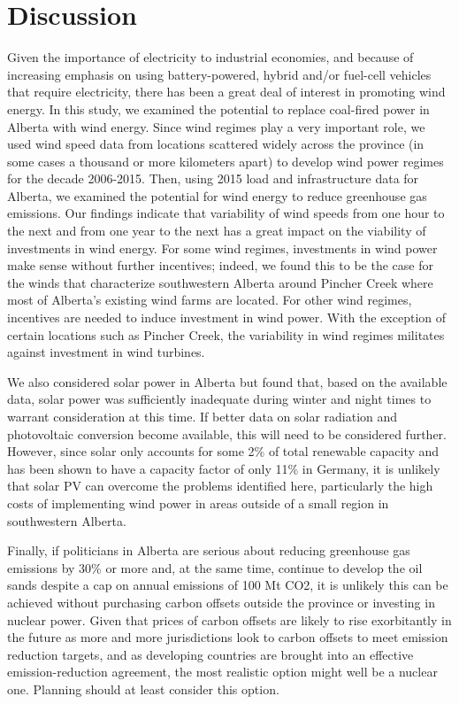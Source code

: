 \section{Discussion}
\label{sec:Discussion}

Given the importance of electricity to industrial economies, and because of increasing emphasis on using battery-powered, hybrid and/or fuel-cell vehicles that require electricity, there has been a great deal of interest in promoting wind energy. In this study, we examined the potential to replace coal-fired power in Alberta with wind energy. Since wind regimes play a very important role, we used wind speed data from locations scattered widely across the province (in some cases a thousand or more kilometers apart) to develop wind power regimes for the decade 2006-2015. Then, using 2015 load and infrastructure data for Alberta, we examined the potential for wind energy to reduce greenhouse gas emissions. Our findings indicate that variability of wind speeds from one hour to the next and from one year to the next has a great impact on the viability of investments in wind energy. For some wind regimes, investments in wind power make sense without further incentives; indeed, we found this to be the case for the winds that characterize southwestern Alberta around Pincher Creek where most of Alberta’s existing wind farms are located. For other wind regimes, incentives are needed to induce investment in wind power. With the exception of certain locations such as Pincher Creek, the variability in wind regimes militates against investment in wind turbines.


We also considered solar power in Alberta but found that, based on the available data, solar power was sufficiently inadequate during winter and night times to warrant consideration at this time. If better data on solar radiation and photovoltaic conversion become available, this will need to be considered further. However, since solar only accounts for some 2\% of total renewable capacity and has been shown to have a capacity factor of only 11\% in Germany, it is unlikely that solar PV can overcome the problems identified here, particularly the high costs of implementing wind power in areas outside of a small region in southwestern Alberta. 



Finally, if politicians in Alberta are serious about reducing greenhouse gas emissions by 30\% or more and, at the same time, continue to develop the oil sands despite a cap on annual emissions of 100 Mt CO2, it is unlikely this can be achieved without purchasing carbon offsets outside the province or investing in nuclear power. Given that prices of carbon offsets are likely to rise exorbitantly in the future as more and more jurisdictions look to carbon offsets to meet emission reduction targets, and as developing countries are brought into an effective emission-reduction agreement, the most realistic option might well be a nuclear one. Planning should at least consider this option. 

